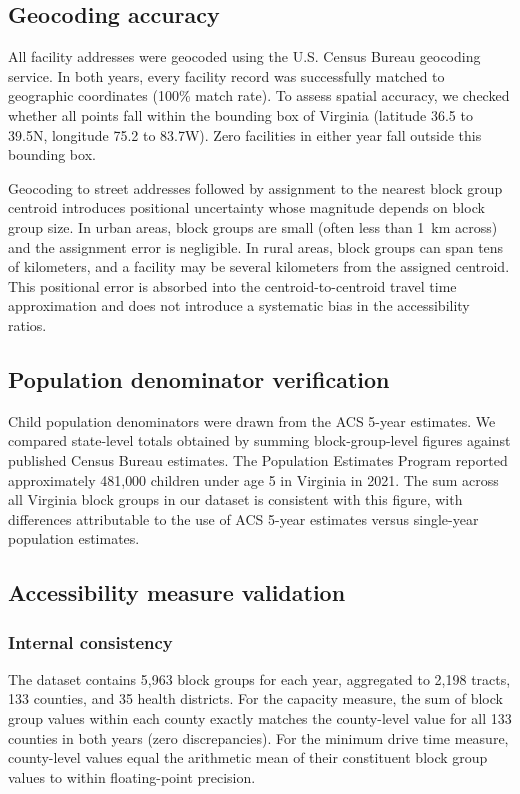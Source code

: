 \documentclass{CUP-JNL-DAP}%
\begin{document}
\subsection{Geocoding accuracy}

All facility addresses were geocoded using the U.S. Census Bureau geocoding service. In both years, every facility record was successfully matched to geographic coordinates (100\% match rate). To assess spatial accuracy, we checked whether all points fall within the bounding box of Virginia (latitude 36.5 to 39.5\textdegree N, longitude 75.2 to 83.7\textdegree W). Zero facilities in either year fall outside this bounding box.

Geocoding to street addresses followed by assignment to the nearest block group centroid introduces positional uncertainty whose magnitude depends on block group size. In urban areas, block groups are small (often less than 1~km across) and the assignment error is negligible. In rural areas, block groups can span tens of kilometers, and a facility may be several kilometers from the assigned centroid. This positional error is absorbed into the centroid-to-centroid travel time approximation and does not introduce a systematic bias in the accessibility ratios.

\subsection{Population denominator verification}

Child population denominators were drawn from the ACS 5-year estimates. We compared state-level totals obtained by summing block-group-level figures against published Census Bureau estimates. The Population Estimates Program reported approximately 481{,}000 children under age 5 in Virginia in 2021\citep{census_pop}. The sum across all Virginia block groups in our dataset is consistent with this figure, with differences attributable to the use of ACS 5-year estimates versus single-year population estimates.

\subsection{Accessibility measure validation}

\subsubsection{Internal consistency}

The dataset contains 5{,}963 block groups for each year, aggregated to 2{,}198 tracts, 133 counties, and 35 health districts. For the capacity measure, the sum of block group values within each county exactly matches the county-level value for all 133 counties in both years (zero discrepancies). For the minimum drive time measure, county-level values equal the arithmetic mean of their constituent block group values to within floating-point precision.
\end{document}
